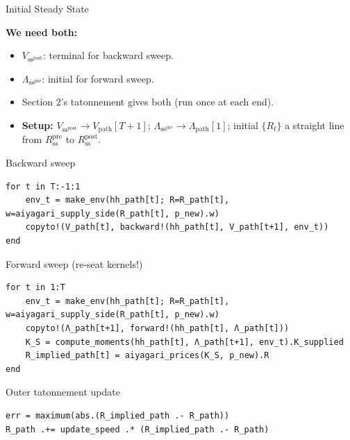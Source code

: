 \documentclass[10pt,aspectratio=169]{beamer}
\begin{document}
\begin{frame}{Initial Steady State}

\textbf{We need both:}

\begin{itemize}
  \item $V_{\mathrm{ss}^{\mathrm{post}}}$: terminal for backward sweep.
  \item $\Lambda_{\mathrm{ss}^{\mathrm{pre}}}$: initial for forward sweep.
\end{itemize}

\vspace{0.4em}

\begin{itemize}
  \item Section 2's tatonnement gives both (run once at each end).
  \item \textbf{Setup:} $V_{\mathrm{ss}^{\mathrm{post}}} \to V_\mathrm{path}[T+1]$; $\Lambda_{\mathrm{ss}^{\mathrm{pre}}} \to \Lambda_\mathrm{path}[1]$; initial $\{R_t\}$ a straight line from $R^{\mathrm{pre}}_{\mathrm{ss}}$ to $R^{\mathrm{post}}_{\mathrm{ss}}$.
\end{itemize}

\end{frame}

\begin{frame}[fragile]{Backward sweep}
\begin{lstlisting}
for t in T:-1:1
    env_t = make_env(hh_path[t]; R=R_path[t], w=aiyagari_supply_side(R_path[t], p_new).w)
    copyto!(V_path[t], backward!(hh_path[t], V_path[t+1], env_t))
end
\end{lstlisting}

\end{frame}

\begin{frame}[fragile]{Forward sweep (re-seat kernels!)}
\begin{lstlisting}
for t in 1:T
    env_t = make_env(hh_path[t]; R=R_path[t], w=aiyagari_supply_side(R_path[t], p_new).w)
    copyto!(Λ_path[t+1], forward!(hh_path[t], Λ_path[t]))
    K_S = compute_moments(hh_path[t], Λ_path[t+1], env_t).K_supplied
    R_implied_path[t] = aiyagari_prices(K_S, p_new).R
end
\end{lstlisting}

\end{frame}

\begin{frame}[fragile]{Outer tatonnement update}
\begin{lstlisting}
err = maximum(abs.(R_implied_path .- R_path))
R_path .+= update_speed .* (R_implied_path .- R_path)
\end{lstlisting}

\end{frame}
\end{document}
